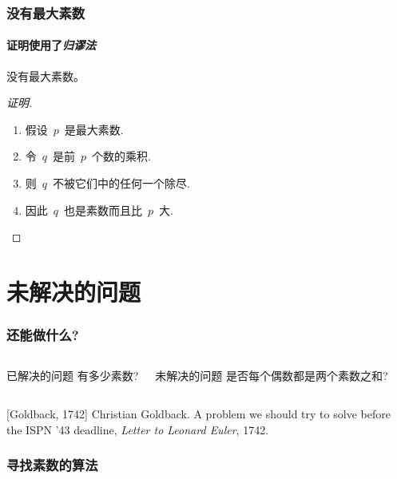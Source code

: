 \begin{center}
\begin{CJK*}{GBK}{kai}
\begin{frame} 
  \frametitle{没有最大素数} 
  \framesubtitle{证明使用了\textit{归谬法}} 
 
  \begin{thm} 
  没有最大素数。 
  \end{thm} 
  \begin{proof}[证明] 
    \begin{enumerate} 
    \item<1-> 假设~$p$~是最大素数. 
    \item<2-> 令~$q$~是前~$p$~个数的乘积. 
    \item<3-> 则~$q$~不被它们中的任何一个除尽. 
    \item<1-> 因此~$q$~也是素数而且比~$p$~大.\qedhere 
    \end{enumerate} 
  \end{proof} 
\end{frame} 
 
\section{未解决的问题} 
 
\begin{frame} 
  \frametitle{还能做什么?} 
  \begin{columns}[t] 
  \begin{block}{已解决的问题} 
    有多少素数? 
  \end{block} 
  \begin{block}{未解决的问题} 
    是否每个偶数都是两个素数之和?\cite{Goldbach1742} 
  \end{block} 
  \end{columns} 
\end{frame} 
 
\begin{frame} 
  \begin{thebibliography}{10} 
  [Goldback, 1742] 
    Christian Goldback. 
    \newblock A problem we should try to solve before the ISPN '43 deadline, 
    \newblock \emph{Letter to Leonard Euler}, 1742. 
  \end{thebibliography} 
\end{frame} 
 
\begin{frame}[fragile] 
  \frametitle{寻找素数的算法} 

 
\end{frame} 
 

\end{CJK*}
\end{center}
